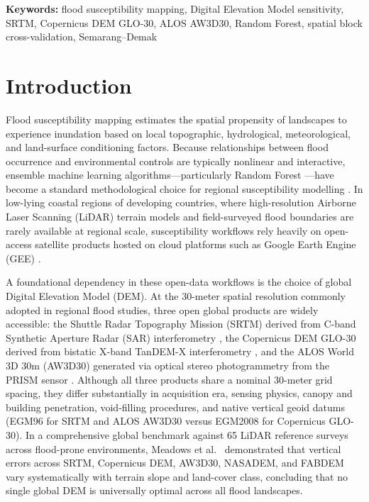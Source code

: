 \documentclass[11pt,twoside]{article}
\newcommand{\SMDSKeywords}[1]{
\vspace{0.5em}
\noindent\textbf{Keywords:} #1
}
\begin{document}
\SMDSKeywords{flood susceptibility mapping, Digital Elevation Model sensitivity, SRTM, Copernicus DEM GLO-30, ALOS AW3D30, Random Forest, spatial block cross-validation, Semarang--Demak}

\section{Introduction}\label{sec:introduction}

Flood susceptibility mapping estimates the spatial propensity of landscapes to experience inundation based on local topographic, hydrological, meteorological, and land-surface conditioning factors. Because relationships between flood occurrence and environmental controls are typically nonlinear and interactive, ensemble machine learning algorithms---particularly Random Forest \cite{breiman2001}---have become a standard methodological choice for regional susceptibility modelling \cite{saha2021,avand2022,hakim2026}. In low-lying coastal regions of developing countries, where high-resolution Airborne Laser Scanning (LiDAR) terrain models and field-surveyed flood boundaries are rarely available at regional scale, susceptibility workflows rely heavily on open-access satellite products hosted on cloud platforms such as Google Earth Engine (GEE) \cite{gorelick2017}.

A foundational dependency in these open-data workflows is the choice of global Digital Elevation Model (DEM). At the 30-meter spatial resolution commonly adopted in regional flood studies, three open global products are widely accessible: the Shuttle Radar Topography Mission (SRTM) derived from C-band Synthetic Aperture Radar (SAR) interferometry \cite{farr2007}, the Copernicus DEM GLO-30 derived from bistatic X-band TanDEM-X interferometry \cite{esa_glo30}, and the ALOS World 3D 30m (AW3D30) generated via optical stereo photogrammetry from the PRISM sensor \cite{tadono2016}. Although all three products share a nominal 30-meter grid spacing, they differ substantially in acquisition era, sensing physics, canopy and building penetration, void-filling procedures, and native vertical geoid datums (EGM96 for SRTM and ALOS AW3D30 versus EGM2008 for Copernicus GLO-30). In a comprehensive global benchmark against 65 LiDAR reference surveys across flood-prone environments, Meadows et al.\ \cite{meadows2024} demonstrated that vertical errors across SRTM, Copernicus DEM, AW3D30, NASADEM, and FABDEM vary systematically with terrain slope and land-cover class, concluding that no single global DEM is universally optimal across all flood landscapes.
\end{document}
